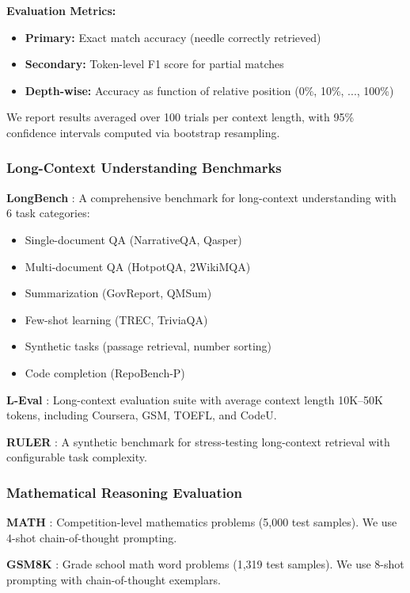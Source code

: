 \documentclass[twocolumn]{article}
\begin{document}
\textbf{Evaluation Metrics:}
\begin{itemize}
    \item \textbf{Primary:} Exact match accuracy (needle correctly retrieved)
    \item \textbf{Secondary:} Token-level F1 score for partial matches
    \item \textbf{Depth-wise:} Accuracy as function of relative position (0\%, 10\%, ..., 100\%)
\end{itemize}

We report results averaged over 100 trials per context length, with 95\% confidence intervals computed via bootstrap resampling.

\subsubsection{Long-Context Understanding Benchmarks}

\textbf{LongBench} \cite{longbench}: A comprehensive benchmark for long-context understanding with 6 task categories:
\begin{itemize}
    \item Single-document QA (NarrativeQA, Qasper)
    \item Multi-document QA (HotpotQA, 2WikiMQA)
    \item Summarization (GovReport, QMSum)
    \item Few-shot learning (TREC, TriviaQA)
    \item Synthetic tasks (passage retrieval, number sorting)
    \item Code completion (RepoBench-P)
\end{itemize}

\textbf{L-Eval} \cite{leval}: Long-context evaluation suite with average context length 10K--50K tokens, including Coursera, GSM, TOEFL, and CodeU.

\textbf{RULER} \cite{ruler}: A synthetic benchmark for stress-testing long-context retrieval with configurable task complexity.

\subsubsection{Mathematical Reasoning Evaluation}

\textbf{MATH} \cite{math}: Competition-level mathematics problems (5,000 test samples). We use 4-shot chain-of-thought prompting.

\textbf{GSM8K} \cite{gsm8k}: Grade school math word problems (1,319 test samples). We use 8-shot prompting with chain-of-thought exemplars.
\end{document}
